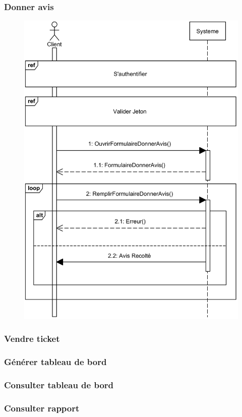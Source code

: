     \subsubsection[Donner avis]{Donner avis}
        \begin{figure}[H]
            \centering
            \includegraphics[width=130mm]{images/sd-donner-avis.png}
            \label{fig:sdDonnerAvis}
        \end{figure}
\pagebreak
    \subsubsection[Vendre billet]{Vendre ticket}
    \subsubsection[Générer tableau de bord]{Générer tableau de bord}
    \subsubsection[Consulter tableau de bord]{Consulter tableau de bord}
    \subsubsection[Consulter rapport]{Consulter rapport}